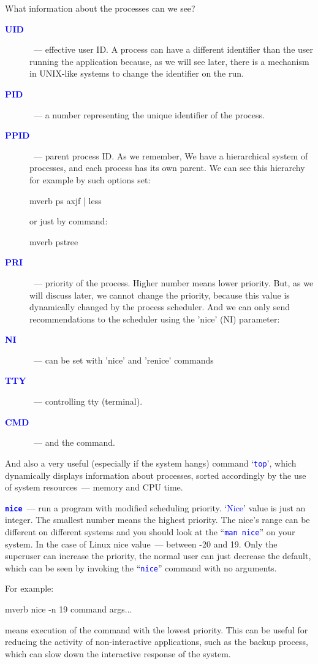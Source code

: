 \documentclass[12pt]{report}
\newcommand{\struct}[1]{\textcolor{blue}{#1}}
\newcommand{\cmd}[1]{\textcolor{blue}{\tt #1}}
\begin{document}
What information about the processes can we see?
\begin{description}
\item[{\bf\struct{UID}}]~--- effective user ID. A process can have a different
identifier than the user running the application because, as we will see
later, there is a mechanism in UNIX-like systems to change the identifier
on the run.
\item[{\bf\struct{PID}}]~--- a number representing the unique identifier of the process.
\item[{\bf\struct{PPID}}]~--- parent process ID. As we remember, We have a
hierarchical system of processes, and each process has its own parent. We
can see this hierarchy for example by such options set:
\begin{code}{mverb}
ps axjf | less
\end{code}
or just by command:
\begin{code}{mverb}
pstree
\end{code}
\item[{\bf\struct{PRI}}]~--- priority of the process. Higher number means lower
priority. But, as we will discuss later, we cannot change the priority,
because this value is dynamically changed by the process scheduler. And
we can only send recommendations to the scheduler using the 'nice' (NI)
parameter:
\item[{\bf\struct{NI}}]~--- can be set with 'nice' and 'renice' commands
\item[{\bf\struct{TTY}}]~--- controlling tty (terminal).
\item[{\bf\struct{CMD}}]~--- and the command.
\end{description}

And also a very useful (especially if the system hangs) command `\cmd{top}',
which dynamically displays information about processes, sorted
accordingly by the use of system resources~--- memory and CPU time.

{\bf\cmd{nice}}~--- run a program with modified scheduling priority.
`\struct{Nice}' value is just an integer. The smallest number means
the highest priority. The nice's range can be different on different systems
and you should look at the ``\cmd{man nice}'' on your system. In the case of
Linux nice value~--- between -20 and 19. Only the superuser can increase
the priority, the normal user can just decrease the default, which can be seen
by invoking the ``\cmd{nice}'' command with no arguments.

For example:
\begin{code}{mverb}
nice -n 19 command args...
\end{code}
means execution of the command with the lowest priority. This can be useful
for reducing the activity of non-interactive applications, such as the backup
process, which can slow down the interactive response of the system.
\end{document}
